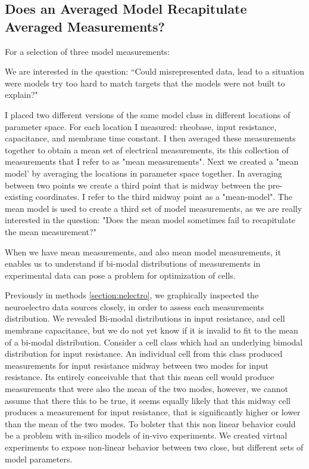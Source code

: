 \subsection{Does an Averaged Model Recapitulate Averaged Measurements?}
For a selection of three model measurements:

We are interested in the question: ``Could misrepresented data, lead to a situation were models try too hard to match targets that the models were not built to explain?" %

I placed two different versions of the same  model class in different locations of parameter space. For each location I measured: rheobase, input resistance, capacitance, and membrane time constant.
I then averaged these measurements together to obtain a mean set of electrical measurements, its this collection of measurements that I refer to as "mean measurements". Next we created a "mean model' by averaging the locations in parameter space together.
In averaging between two points we create a third point that is midway between the pre-existing coordinates. I refer to the third midway point as a "mean-model".
The mean model is used to create a third set of model measurements, as we are really interested in the question: "Does the mean model sometimes fail to recapitulate the mean measurement?"


When we have mean measurements, and also mean model measurements, it enables us to understand if bi-modal distributions of measurements in experimental data can pose a problem for optimization of cells.

Previously in methods \ref{section:nelectro}, we graphically inspected the neuroelectro data sources closely, in order to assess each measurements distribution.
We revealed Bi-modal distributions in input resistance, and cell membrane capacitance, but we do not yet know if it is invalid to fit to the mean of a bi-modal distribution.
Consider a  cell class which had an underlying bimodal distribution for input resistance. An individual cell from this class produced measurements for input resistance midway between two modes for input resistance.
Its entirely conceivable that that this mean cell would produce measurements that were also the mean of the two modes, however, we cannot assume that there this to be true, it seems equally likely that this midway cell produces a measurement for input resistance, that is significantly higher or lower than the mean of the two modes. To bolster that this non linear behavior could be a problem with in-silico models of in-vivo experiments.
We created virtual experiments to expose non-linear behavior between two  close, but different sets of model parameters.

